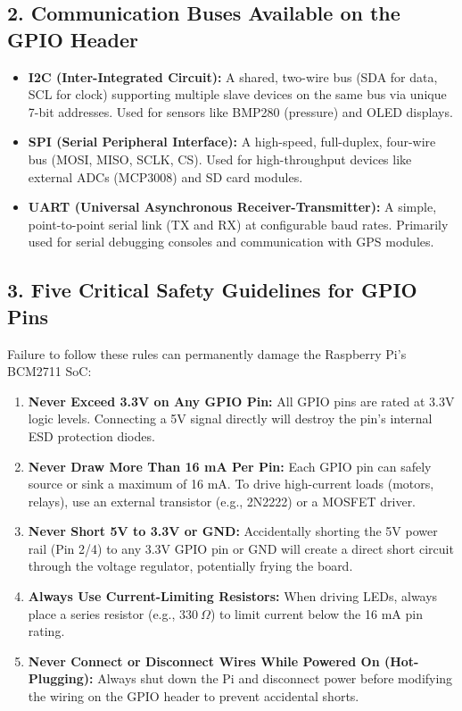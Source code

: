\subsection{2. Communication Buses Available on the GPIO Header}
\begin{itemize}
  \item   \textbf{I2C (Inter-Integrated Circuit):} A shared, two-wire bus (SDA for data, SCL for clock) supporting multiple slave devices on the same bus via unique 7-bit addresses. Used for sensors like BMP280 (pressure) and OLED displays.
  \item   \textbf{SPI (Serial Peripheral Interface):} A high-speed, full-duplex, four-wire bus (MOSI, MISO, SCLK, CS). Used for high-throughput devices like external ADCs (MCP3008) and SD card modules.
  \item   \textbf{UART (Universal Asynchronous Receiver-Transmitter):} A simple, point-to-point serial link (TX and RX) at configurable baud rates. Primarily used for serial debugging consoles and communication with GPS modules.
\end{itemize}


\subsection{3. Five Critical Safety Guidelines for GPIO Pins}
Failure to follow these rules can permanently damage the Raspberry Pi's BCM2711 SoC:
\begin{enumerate}
  \item \textbf{Never Exceed 3.3V on Any GPIO Pin:} All GPIO pins are rated at 3.3V logic levels. Connecting a 5V signal directly will destroy the pin's internal ESD protection diodes.
  \item \textbf{Never Draw More Than 16 mA Per Pin:} Each GPIO pin can safely source or sink a maximum of 16 mA. To drive high-current loads (motors, relays), use an external transistor (e.g., 2N2222) or a MOSFET driver.
  \item \textbf{Never Short 5V to 3.3V or GND:} Accidentally shorting the 5V power rail (Pin 2/4) to any 3.3V GPIO pin or GND will create a direct short circuit through the voltage regulator, potentially frying the board.
  \item \textbf{Always Use Current-Limiting Resistors:} When driving LEDs, always place a series resistor (e.g., $330\ \Omega$) to limit current below the 16 mA pin rating.
  \item \textbf{Never Connect or Disconnect Wires While Powered On (Hot-Plugging):} Always shut down the Pi and disconnect power before modifying the wiring on the GPIO header to prevent accidental shorts.
\end{enumerate}


